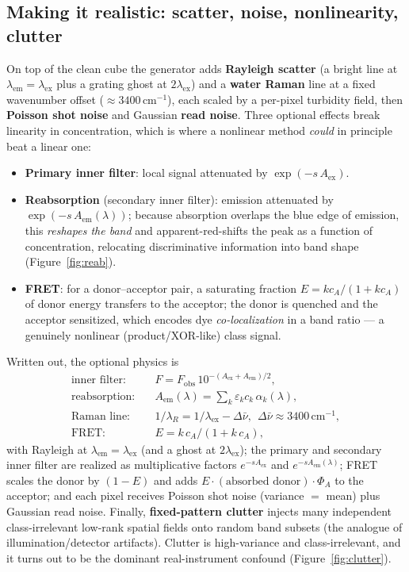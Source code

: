 \documentclass[11pt]{article}
\begin{document}
\subsection{Making it realistic: scatter, noise, nonlinearity, clutter}
On top of the clean cube the generator adds \textbf{Rayleigh scatter} (a bright line at
$\lambda_\mathrm{em}=\lambda_\mathrm{ex}$ plus a grating ghost at $2\lambda_\mathrm{ex}$) and a
\textbf{water Raman} line at a fixed wavenumber offset ($\approx 3400\,\mathrm{cm}^{-1}$), each
scaled by a per-pixel turbidity field, then \textbf{Poisson shot noise} and Gaussian
\textbf{read noise}. Three optional effects break linearity in concentration, which is where a
nonlinear method \emph{could} in principle beat a linear one:
\begin{itemize}[leftmargin=1.4em,itemsep=0.1em]
\item \textbf{Primary inner filter}: local signal attenuated by $\exp(-s\,A_\mathrm{ex})$.
\item \textbf{Reabsorption} (secondary inner filter): emission attenuated by
$\exp(-s\,A_\mathrm{em}(\lambda))$; because absorption overlaps the blue edge of emission, this
\emph{reshapes the band} and apparent-red-shifts the peak as a function of concentration, relocating
discriminative information into band shape (Figure~\ref{fig:reab}).
\item \textbf{FRET}: for a donor--acceptor pair, a saturating fraction $E = k c_A/(1+k c_A)$ of donor
energy transfers to the acceptor; the donor is quenched and the acceptor sensitized, which encodes
dye \emph{co-localization} in a band ratio --- a genuinely nonlinear (product/XOR-like) class signal.
\end{itemize}
Written out, the optional physics is
\begin{align}
\text{inner filter:}\quad & F = F_{\mathrm{obs}}\,10^{-(A_{\mathrm{ex}}+A_{\mathrm{em}})/2},\\
\text{reabsorption:}\quad & A_{\mathrm{em}}(\lambda)=\textstyle\sum_k \varepsilon_k c_k\,\alpha_k(\lambda),\\
\text{Raman line:}\quad & 1/\lambda_R = 1/\lambda_{\mathrm{ex}}-\Delta\bar\nu,\ \ \Delta\bar\nu\approx 3400\,\mathrm{cm}^{-1},\\
\text{FRET:}\quad & E = k\,c_A/(1+k\,c_A),
\end{align}
with Rayleigh at $\lambda_{\mathrm{em}}=\lambda_{\mathrm{ex}}$ (and a ghost at $2\lambda_{\mathrm{ex}}$); the
primary and secondary inner filter are realized as multiplicative factors $e^{-sA_{\mathrm{ex}}}$ and
$e^{-sA_{\mathrm{em}}(\lambda)}$; FRET scales the donor by $(1-E)$ and adds
$E\cdot(\text{absorbed donor})\cdot\Phi_A$ to the acceptor; and each pixel receives Poisson shot noise
(variance $=$ mean) plus Gaussian read noise.
Finally, \textbf{fixed-pattern clutter} injects many independent class-irrelevant low-rank spatial
fields onto random band subsets (the analogue of illumination/detector artifacts). Clutter is
high-variance and class-irrelevant, and it turns out to be the dominant real-instrument confound
(Figure~\ref{fig:clutter}).
\end{document}
